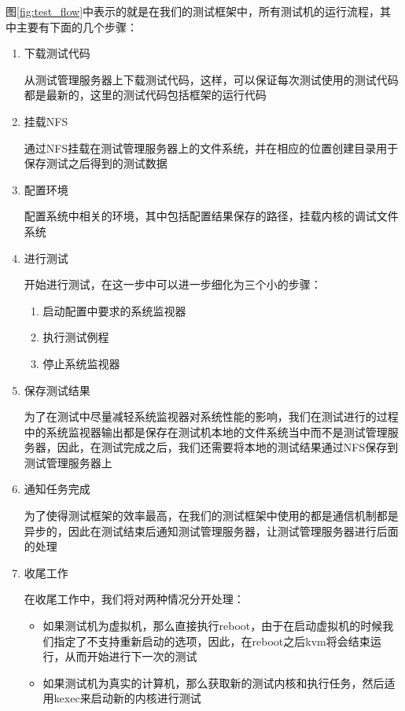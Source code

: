图\ref{fig:test_flow}中表示的就是在我们的测试框架中，所有测试机的运行流程，其中主要有下面的几个步骤：
\begin{enumerate}
\item 下载测试代码

从测试管理服务器上下载测试代码，这样，可以保证每次测试使用的测试代码都是最新的，这里的测试代码包括框架的运行代码

\item 挂载NFS

通过NFS挂载在测试管理服务器上的文件系统，并在相应的位置创建目录用于保存测试之后得到的测试数据

\item 配置环境

配置系统中相关的环境，其中包括配置结果保存的路径，挂载内核的调试文件系统


\item 进行测试

开始进行测试，在这一步中可以进一步细化为三个小的步骤：
\begin{enumerate}
\item 启动配置中要求的系统监视器
\item 执行测试例程
\item 停止系统监视器
\end{enumerate}

\item 保存测试结果

为了在测试中尽量减轻系统监视器对系统性能的影响，我们在测试进行的过程中的系统监视器输出都是保存在测试机本地的文件系统当中而不是测试管理服务器，因此，在测试完成之后，我们还需要将本地的测试结果通过NFS保存到测试管理服务器上

\item 通知任务完成

为了使得测试框架的效率最高，在我们的测试框架中使用的都是通信机制都是异步的，因此在测试结束后通知测试管理服务器，让测试管理服务器进行后面的处理

\item 收尾工作

在收尾工作中，我们将对两种情况分开处理：
\begin{itemize}
\item 如果测试机为虚拟机，那么直接执行reboot，由于在启动虚拟机的时候我们指定了不支持重新启动的选项，因此，在reboot之后kvm将会结束运行，从而开始进行下一次的测试
\item 如果测试机为真实的计算机，那么获取新的测试内核和执行任务，然后适用kexec来启动新的内核进行测试
\end{itemize}
\end{enumerate}


